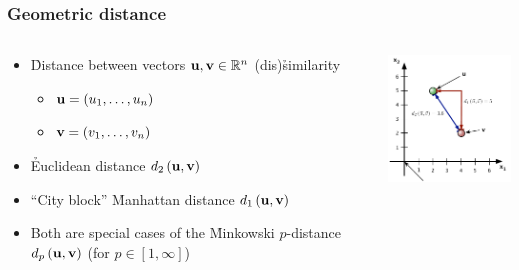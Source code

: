 \begin{frame}
  \frametitle{Geometric distance}

  \begin{columns}[T]
    \begin{column}{60mm}
      \begin{itemize}
      \item \h{Distance} between vectors $\vu, \vv \in \setR^n$ \so
        (dis)\h{similarity}
        \begin{itemize}
        \item $\vu = (u_1, \ldots, u_n)$
        \item $\vv = (v_1, \ldots, v_n)$
        \end{itemize}
      \item<2-> \h{Euclidean} distance $\dist[2]{\vu}{\vv}$
      \item<3-> ``City block'' \h{Manhattan} distance $\dist[1]{\vu}{\vv}$
      \item<4-> Both are special cases of the \h{Minkowski} $p$-distance
        $\dist[p]{\vu}{\vv}$ (for $p\in [1, \infty]$)
      \end{itemize}
    \end{column}
    \begin{column}{45mm}
      \includegraphics[width=45mm]{img/2_distance_examples}
    \end{column}
  \end{columns}
  \gap[.5]
\end{frame}


